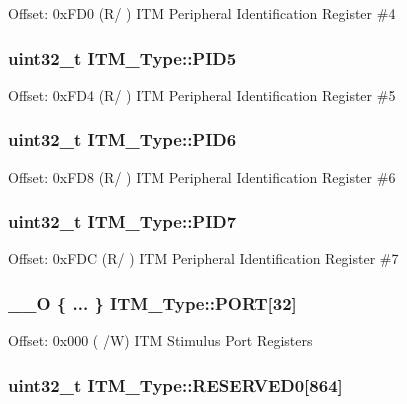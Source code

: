 Offset\-: 0x\-F\-D0 (R/ ) I\-T\-M Peripheral Identification Register \#4 \hypertarget{structITM__Type_a9353055ceb7024e07d59248e54502cb9}{
\subsubsection[{P\-I\-D5}]{ uint32\-\_\-t I\-T\-M\-\_\-\-Type\-::\-P\-I\-D5}}\label{structITM__Type_a9353055ceb7024e07d59248e54502cb9}
Offset\-: 0x\-F\-D4 (R/ ) I\-T\-M Peripheral Identification Register \#5 \hypertarget{structITM__Type_a755c0ec919e7dbb5f7ff05c8b56a3383}{
\subsubsection[{P\-I\-D6}]{ uint32\-\_\-t I\-T\-M\-\_\-\-Type\-::\-P\-I\-D6}}\label{structITM__Type_a755c0ec919e7dbb5f7ff05c8b56a3383}
Offset\-: 0x\-F\-D8 (R/ ) I\-T\-M Peripheral Identification Register \#6 \hypertarget{structITM__Type_aa31ca6bb4b749201321b23d0dbbe0704}{
\subsubsection[{P\-I\-D7}]{ uint32\-\_\-t I\-T\-M\-\_\-\-Type\-::\-P\-I\-D7}}\label{structITM__Type_aa31ca6bb4b749201321b23d0dbbe0704}
Offset\-: 0x\-F\-D\-C (R/ ) I\-T\-M Peripheral Identification Register \#7 \hypertarget{structITM__Type_a4efd85680da427c5bf1dbd874c7a15a0}{
\subsubsection[{P\-O\-R\-T}]{\setlength{\rightskip}{0pt plus 5cm}\-\_\-\-\_\-\-O \{ ... \}    I\-T\-M\-\_\-\-Type\-::\-P\-O\-R\-T\mbox{[}32\mbox{]}}}\label{structITM__Type_a4efd85680da427c5bf1dbd874c7a15a0}
Offset\-: 0x000 ( /\-W) I\-T\-M Stimulus Port Registers \hypertarget{structITM__Type_a2c5ae30385b5f370d023468ea9914c0e}{
\subsubsection[{R\-E\-S\-E\-R\-V\-E\-D0}]{\setlength{\rightskip}{0pt plus 5cm}uint32\-\_\-t I\-T\-M\-\_\-\-Type\-::\-R\-E\-S\-E\-R\-V\-E\-D0\mbox{[}864\mbox{]}}}\label{structITM__Type_a2c5ae30385b5f370d023468ea9914c0e}
